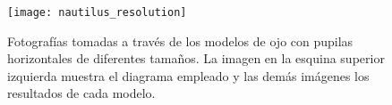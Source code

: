 \documentclass[a4paper,12pt]{article}
\begin{document}
\begin{figure}[hbt!]
 \centering
 \texttt{[image: nautilus\_resolution]}
 \caption{Fotografías tomadas a través de los modelos de ojo con pupilas horizontales de diferentes tamaños. La imagen en la esquina superior izquierda muestra el diagrama empleado y las demás imágenes los resultados de cada modelo. \cite{muntz1984VisualSystem}}
 \label{fig: resolution}
\end{figure}






\clearpage

\printbibliography
\end{document}

